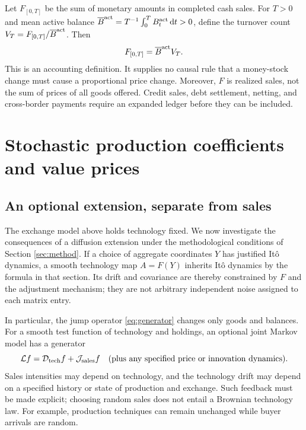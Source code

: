 \documentclass[11pt,letterpaper]{article}
\newcommand{\dd}{\,\mathrm d}
\begin{document}
Let $F_{[0,T]}$ be the sum of monetary amounts in completed cash sales.
For $T>0$ and mean active balance
$\overline B^{\rm act}=T^{-1}\int_0^T B_t^{\rm act}\dd t>0$, define
the turnover count $V_T=F_{[0,T]}/\overline B^{\rm act}$. Then
\begin{equation}\label{eq:turnover}
 F_{[0,T]}=\overline B^{\rm act}V_T.
\end{equation}
This is an accounting definition. It supplies no causal rule that a
money-stock change must cause a proportional price change. Moreover,
$F$ is realized sales, not the sum of prices of all goods offered.
Credit sales, debt settlement, netting, and cross-border payments require
an expanded ledger before they can be included.

\section{Stochastic production coefficients and value prices}
\label{sec:stochastic-technology}
\subsection{An optional extension, separate from sales}
The exchange model above holds technology fixed. We now investigate the
consequences of a diffusion extension under the methodological conditions
of Section \ref{sec:method}. If a choice of aggregate coordinates $Y$
has justified It\^o dynamics, a smooth technology map $A=F(Y)$ inherits
It\^o dynamics by the formula in that section. Its drift and covariance
are thereby constrained by $F$ and the adjustment mechanism; they are
not arbitrary independent noise assigned to each matrix entry.

In particular, the jump operator \eqref{eq:generator} changes only goods
and balances. For a smooth test function of technology and holdings, an
optional joint Markov model has a generator
\[
 \mathcal L f=\mathcal D_{\rm tech}f+\mathcal J_{\rm sales}f
 \quad\text{(plus any specified price or innovation dynamics)}.
\]
Sales intensities may depend on technology, and the technology drift may
depend on a specified history or state of production and exchange.
Such feedback must be made explicit; choosing random sales does not
entail a Brownian technology law. For example, production techniques can
remain unchanged while buyer arrivals are random.
\end{document}
